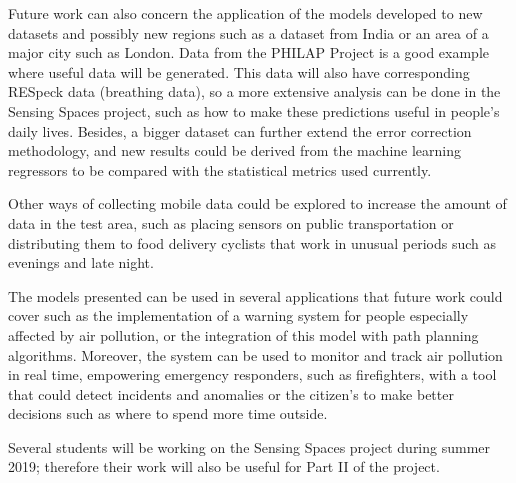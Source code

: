 Future work can also concern the application of the models developed to new datasets and possibly new regions such as a dataset from India or an area of a major city such as London. Data from the PHILAP Project is a good example where useful data will be generated. This data will also have corresponding RESpeck data (breathing data), so a more extensive analysis can be done in the Sensing Spaces project, such as how to make these predictions useful in people's daily lives. Besides, a bigger dataset can further extend the error correction methodology, and new results could be derived from the machine learning regressors to be compared with the statistical metrics used currently. 

Other ways of collecting mobile data could be explored to increase the amount of data in the test area, such as placing sensors on public transportation or distributing them to food delivery cyclists that work in unusual periods such as evenings and late night.

The models presented can be used in several applications that future work could cover such as the implementation of a warning system for people especially affected by air pollution, or the integration of this model with path planning algorithms. Moreover, the system can be used to monitor and track air pollution in real time, empowering emergency responders, such as firefighters, with a tool that could detect incidents and anomalies or the citizen's to make better decisions such as where to spend more time outside.  

Several students will be working on the Sensing Spaces project during summer 2019; therefore their work will also be useful for Part II of the project.
